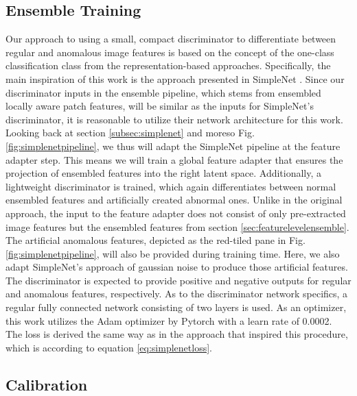 \subsection{Ensemble Training}
\label{sec:discriminator}
Our approach to using a small, compact discriminator to differentiate between regular and anomalous image features is based on the concept of 
the one-class classification class from the representation-based approaches. Specifically, the main inspiration of this work is the approach 
presented in SimpleNet \cite{liu2023simplenet}. Since our discriminator inputs in the ensemble pipeline, which stems from ensembled locally aware patch features, 
will be similar as 
the inputs for SimpleNet's discriminator, it is reasonable to utilize their network architecture for this work. Looking back at section 
\ref{subsec:simplenet} and moreso Fig. \ref{fig:simplenetpipeline}, we thus will adapt the SimpleNet pipeline at the feature adapter step. 
This means we will train a global feature adapter that ensures the projection of ensembled features into the right latent space. Additionally, a lightweight discriminator 
is trained, which again differentiates between normal ensembled features and artificially created abnormal ones. Unlike in the original approach, the input to the feature adapter 
does not consist of only pre-extracted image features 
but the ensembled features from section \ref{sec:featurelevelensemble}. The artificial anomalous features, 
depicted as the red-tiled pane in Fig. \ref{fig:simplenetpipeline}, will also be provided during training time. Here, we also adapt SimpleNet's approach of 
gaussian noise to produce those artificial features. %
The discriminator is expected to provide positive and negative outputs for regular and anomalous features, respectively.
As to the discriminator network specifics, a regular fully connected network consisting of two layers is used. As an optimizer, this work utilizes the 
Adam optimizer by Pytorch with a learn rate of 0.0002. The loss is derived the same way as in the approach that inspired this procedure, 
which is according to equation \ref{eq:simplenetloss}.


\subsection{Calibration}
\label{sec:Calibration}

